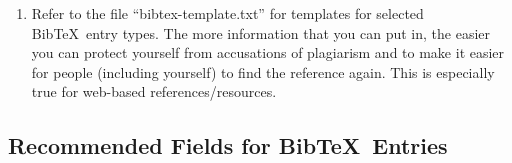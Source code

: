 \documentclass[letter,12pt]{article}
\begin{document}
\begin{enumerate}
\begin{enumerate}
	\item Dictionary.com, ``WORD,'' IAC, Oakland, CA, MONTH DATE, YEAR. Available online at: $\backslash$url\{URL\}; last accessed on August 26, 2014.
	\item AUTHOR, ``TITLE,'' in \{$\backslash$it The New York Times: The Opinion Pages: Op-Ed Contributor\}, The New York Times Company, New York, NY, MONTH DATE, YEAR. Available online at: $\backslash$url\{URL\}; last accessed on August 26, 2014.
	\item When {\sc Bib}\TeX\ entries are created for the aforementioned sources of information, populate the appropriate fields so that each information in the aforementioned sources are included in the {\sc Bib}\TeX\ entries.
	\end{enumerate}
\item Refer to the file ``bibtex-template.txt'' for templates for selected {\sc Bib}\TeX\ entry types. The more information that you can put in, the easier you can protect yourself from accusations of plagiarism and to make it easier for people (including yourself) to find the reference again. This is especially true for web-based references/resources.
\end{enumerate}



\subsection{Recommended Fields for {\sc Bib}\TeX\ Entries}
\label{ssec:RecommendedFieldsforBibTeXEntries}
\end{document}
